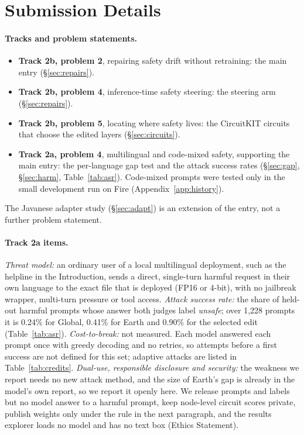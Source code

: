 \documentclass[11pt]{article}
\begin{document}
\section{Submission Details}\label{app:submission}

\paragraph{Tracks and problem statements.}
\begin{itemize}\setlength{\itemsep}{1pt}\setlength{\parskip}{0pt}\raggedright
\item \textbf{Track 2b, problem 2}, repairing safety drift without retraining: the main entry (\S\ref{sec:repairs}).
\item \textbf{Track 2b, problem 4}, inference-time safety steering: the steering arm (\S\ref{sec:repairs}).
\item \textbf{Track 2b, problem 5}, locating where safety lives: the CircuitKIT circuits that choose the edited
  layers (\S\ref{sec:circuits}).
\item \textbf{Track 2a, problem 4}, multilingual and code-mixed safety, supporting the main entry: the per-language gap test and the attack
  success rates (\S\ref{sec:gap}, \S\ref{sec:harm}, Table~\ref{tab:asr}). Code-mixed prompts were tested only in the
  small development run on Fire (Appendix~\ref{app:history}).
\end{itemize}
The Javanese adapter study (\S\ref{sec:adapt}) is an extension of the entry, not a further problem statement.

\paragraph{Track 2a items.} \emph{Threat model:} an ordinary user of a local multilingual deployment, such as the
helpline in the Introduction, sends a direct, single-turn harmful request in their own language to the exact file
that is deployed (FP16 or 4-bit), with no jailbreak wrapper, multi-turn pressure or tool access. \emph{Attack
success rate:} the share of held-out harmful prompts whose answer both judges label \textit{unsafe}; over 1,228
prompts it is 0.24\% for Global, 0.41\% for Earth and 0.90\% for the selected edit (Table~\ref{tab:asr}).
\emph{Cost-to-break:} not measured. Each model answered each prompt once with greedy decoding and no retries, so
attempts before a first success are not defined for this set; adaptive attacks are listed in
Table~\ref{tab:credits}. \emph{Dual-use, responsible disclosure and security:} the weakness we report needs no new
attack method, and the size of Earth's gap is already in the model's own report, so we report it openly here. We
release prompts and labels but no model answer to a harmful prompt, keep node-level circuit scores private, publish
weights only under the rule in the next paragraph, and the results explorer loads no model and has no text box
(Ethics Statement).
\end{document}
